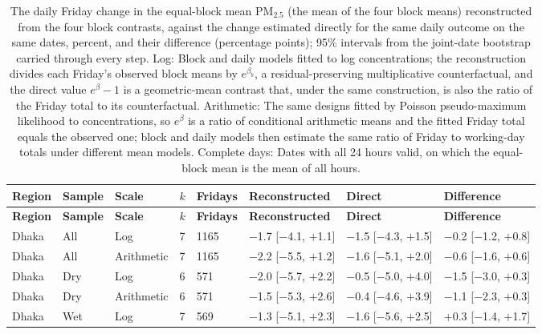 \begingroup\scriptsize
\begin{longtable}{L{1.4cm} L{1.5cm} L{1.5cm} C{0.4cm} C{1.0cm} C{2.4cm} C{2.4cm} C{2.4cm}}
\caption{The daily Friday change in the equal-block mean PM$_{2.5}$ (the mean of the four block means) reconstructed from the four block contrasts, against the change estimated directly for the same daily outcome on the same dates, percent, and their difference (percentage points); 95\% intervals from the joint-date bootstrap carried through every step. Log: Block and daily models fitted to log concentrations; the reconstruction divides each Friday's observed block means by $e^{\beta_b}$, a residual-preserving multiplicative counterfactual, and the direct value $e^{\beta}-1$ is a geometric-mean contrast that, under the same construction, is also the ratio of the Friday total to its counterfactual. Arithmetic: The same designs fitted by Poisson pseudo-maximum likelihood to concentrations, so $e^{\beta}$ is a ratio of conditional arithmetic means and the fitted Friday total equals the observed one; block and daily models then estimate the same ratio of Friday to working-day totals under different mean models. Complete days: Dates with all 24 hours valid, on which the equal-block mean is the mean of all hours.}\label{tab:s-reconstruct}\\
\toprule
\textbf{Region} & \textbf{Sample} & \textbf{Scale} & \textbf{$k$} & \textbf{Fridays} & \textbf{Reconstructed} & \textbf{Direct} & \textbf{Difference} \\
\midrule\endfirsthead
\toprule
\textbf{Region} & \textbf{Sample} & \textbf{Scale} & \textbf{$k$} & \textbf{Fridays} & \textbf{Reconstructed} & \textbf{Direct} & \textbf{Difference} \\
\midrule\endhead
\bottomrule\endfoot
Dhaka & All & Log & 7 & 1165 & $-$1.7 {\scriptsize[$-$4.1, $+$1.1]} & $-$1.5 {\scriptsize[$-$4.3, $+$1.5]} & $-$0.2 {\scriptsize[$-$1.2, $+$0.8]} \\
Dhaka & All & Arithmetic & 7 & 1165 & $-$2.2 {\scriptsize[$-$5.5, $+$1.2]} & $-$1.6 {\scriptsize[$-$5.1, $+$2.0]} & $-$0.6 {\scriptsize[$-$1.6, $+$0.6]} \\
Dhaka & Dry & Log & 6 & 571 & $-$2.0 {\scriptsize[$-$5.7, $+$2.2]} & $-$0.5 {\scriptsize[$-$5.0, $+$4.0]} & $-$1.5 {\scriptsize[$-$3.0, $+$0.3]} \\
Dhaka & Dry & Arithmetic & 6 & 571 & $-$1.5 {\scriptsize[$-$5.3, $+$2.6]} & $-$0.4 {\scriptsize[$-$4.6, $+$3.9]} & $-$1.1 {\scriptsize[$-$2.3, $+$0.3]} \\
Dhaka & Wet & Log & 7 & 569 & $-$1.3 {\scriptsize[$-$5.1, $+$2.3]} & $-$1.6 {\scriptsize[$-$5.6, $+$2.5]} & $+$0.3 {\scriptsize[$-$1.4, $+$1.7]} \\

\end{longtable}
